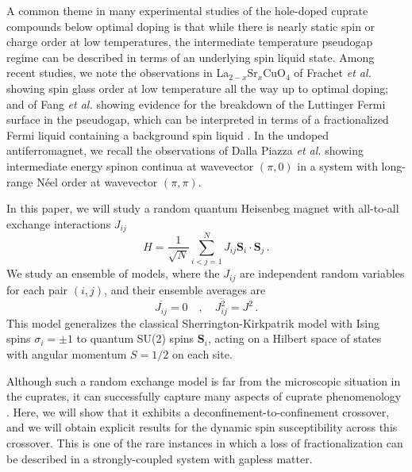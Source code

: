 \documentclass[aps,prx,preprint,onecolumn,citeautoscript,superscriptaddress,nofootinbib,
eqsecnum]{revtex4}
\newcommand{\beq}{\begin{equation}}
\newcommand{\eeq}{\end{equation}}
\begin{document}
A common theme in many experimental studies of the hole-doped cuprate compounds below optimal doping is that while there is nearly static spin or charge order at low temperatures, the intermediate temperature pseudogap regime can be described in terms of an underlying spin liquid state. Among recent studies, we note the observations in La$_{2-x}$Sr$_x$CuO$_4$ of  Frachet {\it et al.\/} \cite{Julien19} showing spin glass order at low temperature all the way up to optimal doping; and of Fang {\it et al.} \cite{Ramshaw20} showing evidence for the breakdown of the Luttinger Fermi surface in the pseudogap, which can be interpreted in terms of a fractionalized Fermi liquid containing a background spin liquid \cite{ancilla1}.  
In the undoped antiferromagnet, we recall the observations of Dalla Piazza {\it et al.\/} \cite{Ronnow15} showing intermediate energy spinon continua at wavevector $(\pi, 0)$ in a system with long-range N\'eel order at wavevector $(\pi, \pi)$.

In this paper, we will study a random quantum Heisenbeg magnet with all-to-all exchange interactions $J_{ij}$
\beq
H = \frac{1}{\sqrt{N}} \sum_{i<j=1}^N J_{ij} {\bm S}_i \cdot {\bm S}_j\,. \label{SU2Ham}
\eeq
We study an ensemble of models, where the $J_{ij}$ are independent random variables for each pair $(i,j)$, and their ensemble averages are
\beq
\overline{J_{ij}} = 0 \quad, \quad \overline{J_{ij}^2} = J^2\,.
\eeq
This model generalizes the classical Sherrington-Kirkpatrik model with Ising spins $\sigma_i = \pm 1$ to quantum SU(2) spins ${\bm S}_i$, acting on a Hilbert space of states with angular momentum $S=1/2$ on each site. 

Although such a random exchange model is far from the microscopic situation in the cuprates, it can successfully capture many aspects of cuprate phenomenology \cite{CGPS}. Here, we will show that it exhibits a deconfinement-to-confinement crossover, and we will obtain explicit results for the dynamic spin susceptibility across this crossover. This is one of the rare instances in which a loss of fractionalization can be described in a strongly-coupled system with gapless matter.
\end{document}
